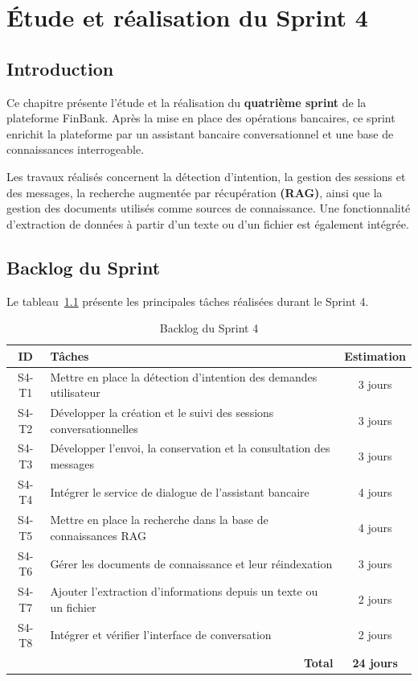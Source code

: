 \chapter{Étude et réalisation du Sprint 4}
\label{chap:sprint4}

\section{Introduction}
\label{sec:intro_sprint4}

Ce chapitre présente l'étude et la réalisation du
\textbf{quatrième sprint} de la plateforme FinBank. Après la mise en
place des opérations bancaires, ce sprint enrichit la plateforme par
un assistant bancaire conversationnel et une base de connaissances
interrogeable.

Les travaux réalisés concernent la détection d'intention, la gestion
des sessions et des messages, la recherche augmentée par récupération
\textbf{(RAG)}, ainsi que la gestion des documents utilisés comme
sources de connaissance. Une fonctionnalité d'extraction de données
à partir d'un texte ou d'un fichier est également intégrée.

\section{Backlog du Sprint}
\label{sec:backlog_sprint4}

Le tableau~\ref{tab:backlog_sprint4} présente les principales tâches
réalisées durant le Sprint 4.

\begin{table}[htbp]
\centering
\caption{Backlog du Sprint 4}
\label{tab:backlog_sprint4}
\renewcommand{\arraystretch}{1.3}
\begin{tabular}{|c|p{10cm}|c|}
\hline
\textbf{ID} & \textbf{Tâches} & \textbf{Estimation} \\
\hline
S4-T1 & Mettre en place la détection d'intention des demandes utilisateur & 3 jours \\
\hline
S4-T2 & Développer la création et le suivi des sessions conversationnelles & 3 jours \\
\hline
S4-T3 & Développer l'envoi, la conservation et la consultation des messages & 3 jours \\
\hline
S4-T4 & Intégrer le service de dialogue de l'assistant bancaire & 4 jours \\
\hline
S4-T5 & Mettre en place la recherche dans la base de connaissances RAG & 4 jours \\
\hline
S4-T6 & Gérer les documents de connaissance et leur réindexation & 3 jours \\
\hline
S4-T7 & Ajouter l'extraction d'informations depuis un texte ou un fichier & 2 jours \\
\hline
S4-T8 & Intégrer et vérifier l'interface de conversation & 2 jours \\
\hline
\multicolumn{2}{|r|}{\textbf{Total}} & \textbf{24 jours} \\
\hline
\end{tabular}
\end{table}

